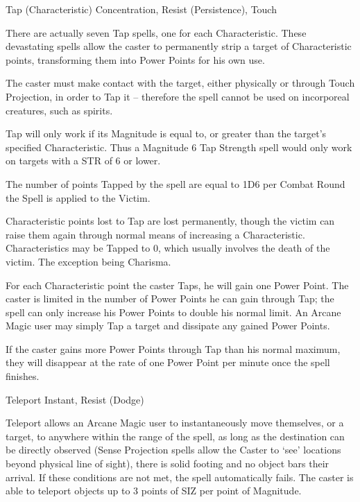 \begin{rpg-spell}
{Tap (Characteristic)}
{Concentration, Resist (Persistence), Touch}

There are actually seven Tap spells, one for each Characteristic. These devastating spells allow the caster to permanently strip a target of Characteristic points, transforming them into Power Points for his own use. 

The caster must make contact with the target, either physically or through Touch Projection, in order to Tap it – therefore the spell cannot be used on incorporeal creatures, such as spirits. 

Tap will only work if its Magnitude is equal to, or greater than the target’s specified Characteristic. Thus a Magnitude 6 Tap Strength spell would only work on targets with a STR of 6 or lower. 

The number of points Tapped by the spell are equal to 1D6 per Combat Round the Spell is applied to the Victim.

Characteristic points lost to Tap are lost permanently, though the victim can raise them again through normal means of increasing a Characteristic. Characteristics may be Tapped to 0, which usually involves the death of the victim. The exception being Charisma.

For each Characteristic point the caster Taps, he will gain one Power Point. The caster is limited in the number of Power Points he can gain through Tap; the spell can only increase his Power Points to double his normal limit. An Arcane Magic user may simply Tap a target and dissipate any gained Power Points. 

If the caster gains more Power Points through Tap than his normal maximum, they will disappear at the rate of one Power Point per minute once the spell finishes. 
\end{rpg-spell}


\begin{rpg-spell}
{Teleport}
{Instant, Resist (Dodge)}

Teleport allows an Arcane Magic user to instantaneously move themselves, or a target, to anywhere within the range of the spell, as long as the destination can be directly observed (Sense Projection spells allow the Caster to ‘see’ locations beyond physical line of sight), there is solid footing and no object bars their arrival. If these conditions are not met, the spell automatically fails. The caster is able to teleport objects up to 3 points of SIZ per point of Magnitude.
\end{rpg-spell}


